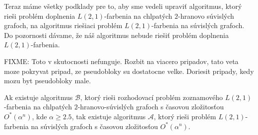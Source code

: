 Teraz máme všetky podklady pre to, aby sme vedeli upraviť algoritmus,
ktorý rieši problém doplnenia $L(2,1)$-farbenia na chlpatých
$2$-hranovo súvislých grafoch, na algoritmus riešiaci problém $L(2,1)$-farbenia
na súvislých grafoch. Do pozornosti dávame, že náš algoritmus nebude riešiť
problém doplnenia $L(2,1)$-farbenia.

\begin{veta}
    FIXME: Toto v skutocnosti nefunguje. Rozbit na viacero pripadov, tato veta moze pokryvat pripad, ze
    pseudobloky su dostatocne velke. Doriesit pripady, kedy mozu byt pseudobloky male.

    Ak existuje algoritmus $\mathcal{B}$, ktorý rieši rozhodovací problém zoznamového $L(2,1)$-farbenia
    na chlpatých $2$-hranovo-súvislých grafoch s časovou zložitosťou $O^*(\alpha^n)$, kde
    $\alpha \ge 2.5$, tak existuje algoritmus $\mathcal{A}$, ktorý rieši problém $L(2,1)$-farbenia
    na súvislých grafoch s časovou zložitosťou $O^*(\alpha^n)$.
\end{veta}

